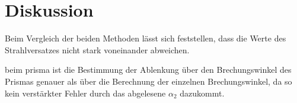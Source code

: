\section{Diskussion}
\label{sec:Diskussion}



Beim Vergleich der beiden Methoden lässt sich feststellen, dass die Werte des Strahlversatzes nicht stark voneinander abweichen.

beim prisma ist die Bestimmung der Ablenkung über den Brechungswinkel des Prismas genauer als über die Berechnung der einzelnen
Brechungswinkel, da so kein verstärkter Fehler durch das abgelesene $\alpha_2$ dazukommt.